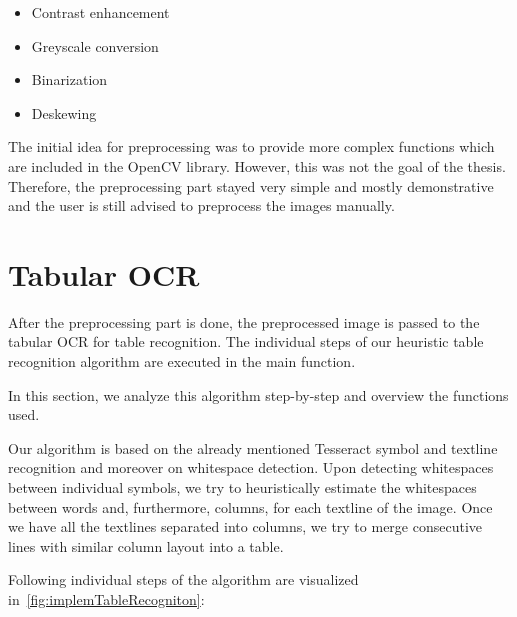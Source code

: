 \begin{itemize}
    \item Contrast enhancement 
    \item Greyscale conversion
    \item Binarization
    \item Deskewing
\end{itemize}

The initial idea for preprocessing was to provide more complex functions which are included in the OpenCV library. However, this was not the goal of the thesis. Therefore, the preprocessing part stayed very simple and mostly demonstrative and the user is still advised to preprocess the images manually.

\section{Tabular OCR}

After the preprocessing part is done, the preprocessed image is passed to the tabular OCR for table recognition. The individual steps of our heuristic table recognition algorithm are executed in the main  function.

In this section, we analyze this algorithm step-by-step and overview the functions used.

Our algorithm is based on the already mentioned Tesseract symbol and textline recognition and moreover on whitespace detection. Upon detecting whitespaces between individual symbols, we try to heuristically estimate the whitespaces between words and, furthermore, columns, for each textline of the image. Once we have all the textlines separated into columns, we try to merge consecutive lines with similar column layout into a table.  

Following individual steps of the algorithm are visualized in~\cref{fig:implemTableRecogniton}:

